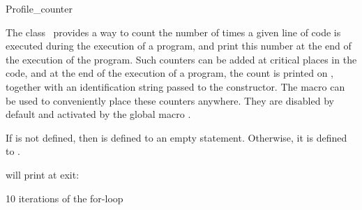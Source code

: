 
\begin{ccRefClass}{Profile_counter}

\ccDefinition


The class \ccRefName\ provides a way to count the number of times a given
line of code is executed during the execution of a program, and print this
number at the end of the execution of the program.  Such counters can be added
at critical places in the code, and at the end of the execution of a program,
the count is printed on , together with an identification
string passed to the constructor.  The macro  can be
used to conveniently place these counters anywhere.  They are disabled by
default and activated by the global macro .


\ccCreation

\ccPropagateThreeToTwoColumns



\ccOperations


{If  is not defined, then  is defined
to an empty statement.  Otherwise, it is defined to .}


will print at exit:

\begin{ccExampleCode}
     10 iterations of the for-loop
\end{ccExampleCode}

\end{ccRefClass}
